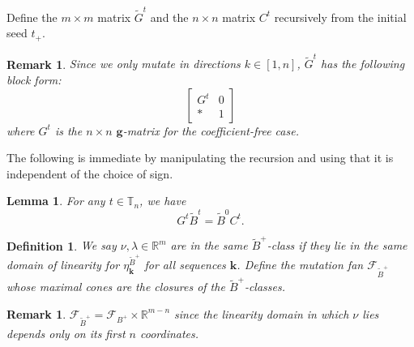 \documentclass{amsart}
\newtheorem{definition}[theorem]{Definition}
\newtheorem{lemma}[theorem]{Lemma}
\newtheorem{remark}[theorem]{Remark}
\numberwithin{theorem}{section}
\newcommand{\bfg}{\boldsymbol{g}}
\newcommand{\bfk}{{\boldsymbol{k}}}
\newcommand{\cF}{\mathcal{F}}
\newcommand{\RR}{\mathbb{R}}
\newcommand{\TT}{\mathbb{T}}
\begin{document}
  Define the $m\times m$ matrix $\tilde G^t$ and the $n\times n$ matrix $C^t$ recursively from the initial seed $t_+$.
  \begin{remark}
    Since we only mutate in directions $k\in[1,n]$, $\tilde G^t$ has the following block form:
    \[\left[\begin{array}{cc} G^t & 0\\ * & 1\end{array}\right]\]
    where $G^t$ is the $n\times n$ $\bfg$-matrix for the coefficient-free case.
  \end{remark}

  The following is immediate by manipulating the recursion and using that it is independent of the choice of sign.
  \begin{lemma}
    For any $t\in\TT_n$, we have
    \[G^t\tilde B^t=\tilde B^0 C^t.\]
  \end{lemma}

  \begin{definition}
    We say $\nu,\lambda\in\RR^m$ are in the same \emph{$\tilde B^+$-class} if they lie in the same domain of linearity for $\eta^{\tilde B^+}_\bfk$ for all sequences $\bfk$.
    Define the \emph{mutation fan} $\cF_{\tilde B^+}$ whose maximal cones are the closures of the $\tilde B^+$-classes.
  \end{definition}
  \begin{remark}
    $\cF_{\tilde B^+}=\cF_{B^+}\times \RR^{m-n}$ since the linearity domain in which $\nu$ lies depends only on its first $n$ coordinates.
  \end{remark}
\end{document}
